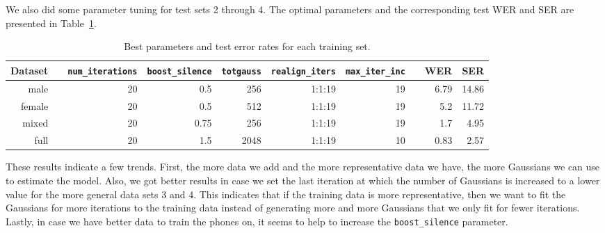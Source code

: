 \documentclass[twocolumn, 11pt]{article}
\begin{document}

We also did some parameter tuning for test sets 2 through 4. The optimal
parameters and the corresponding test WER and SER are presented in
Table~\ref{tab:wer-param}.

\begin{table}\centering
  \begin{tabular}{@{}rcrrrrrcrr@{}}\toprule%
    Dataset & \phantom{a} & \texttt{num\_iterations} & \texttt{boost\_silence}
    & \texttt{totgauss} & \texttt{realign\_iters} & \texttt{max\_iter\_inc}
    & \phantom{a} & WER & SER\\ \midrule%
    male && 20 & 0.5 & 256 & 1:1:19 & 19 && 6.79 & 14.86\\
    female && 20 & 0.5 & 512 & 1:1:19 & 19 && 5.2 & 11.72\\
    mixed && 20 & 0.75 & 256 & 1:1:19 & 19 && 1.7 & 4.95\\
    full && 20 & 1.5 & 2048 & 1:1:19 & 10 && 0.83 & 2.57\\
  \end{tabular}
  \caption{Best parameters and test error rates for each training set.}\label{tab:wer-param}
\end{table}

These results indicate a few trends. First, the more data we add and the more
representative data we have, the more Gaussians we can use to estimate the
model. Also, we got better results in case we set the last iteration at which
the number of Gaussians is increased to a lower value for the more general data
sets 3 and 4. This indicates that if the training data is more representative,
then we want to fit the Gaussians for more iterations to the training data
instead of generating more and more Gaussians that we only fit for fewer
iterations. Lastly, in case we have better data to train the phones on, it seems
to help to increase the \texttt{boost\_silence} parameter.
\end{document}
